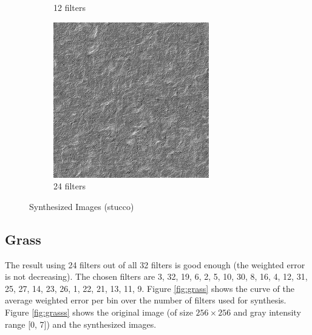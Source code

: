 \documentclass[11pt, oneside]{article}   	%
\begin{document}
\begin{figure}[H]
\begin{subfigure}[b]{0.3\textwidth}
        \caption{12 filters}
        \label{fig:stucco12}
    \end{subfigure}
    \begin{subfigure}[b]{0.3\textwidth}
        \includegraphics[width=\textwidth]{stucco24}
        \caption{24 filters}
        \label{fig:stucco24}
    \end{subfigure}
    \caption{Synthesized Images (stucco)}\label{fig:stuccos}
\end{figure}

\subsection{Grass}
The result using 24 filters out of all 32 filters is good enough (the weighted error is not decreasing). The chosen filters are 3, 32, 19, 6, 2, 5, 10, 30, 8, 16, 4, 12, 31, 25, 27, 14, 23, 26, 1, 22, 21, 13, 11, 9. Figure \ref{fig:grass} shows the curve of the average weighted error per bin over the number of filters used for synthesis. Figure \ref{fig:grasss} shows the original image (of size $256 \times 256$ and gray intensity range [0, 7]) and the synthesized images.
\end{document}
